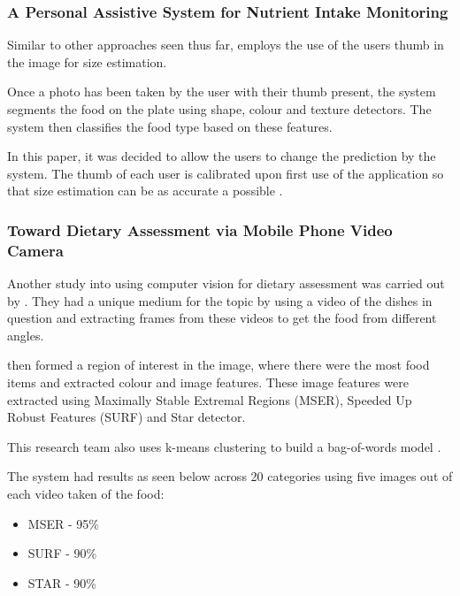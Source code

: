 
\subsubsection*{A Personal Assistive System for Nutrient Intake Monitoring}
Similar to other approaches seen thus far, \textcite{personalAssistive} employs the use of the users thumb in the image for size estimation.

Once a photo has been taken by the user with their thumb present, the system segments the food on the plate using shape, colour and texture detectors.
The system then classifies the food type based on these features.

In this paper, it was decided to allow the users to change the prediction by the system.
The thumb of each user is calibrated upon first use of the application so that size estimation can be as accurate a possible \textcite{personalAssistive}.

\subsubsection*{Toward Dietary Assessment via Mobile Phone Video Camera}
Another study into using computer vision for dietary assessment was carried out by \textcite{chen2010toward}. They had a unique medium for the topic by using a video of the dishes in question and extracting frames from these videos to get the food from different angles.

\textcite{chen2010toward} then formed a region of interest in the image, where there were the most food items and extracted colour and image features.
These image features were extracted using Maximally Stable Extremal Regions (MSER), Speeded Up Robust Features (SURF) and Star detector.

This research team also uses k-means clustering to build a bag-of-words model \textcite{chen2010toward}.

The system had results as seen below across 20 categories using five images out of each video taken of the food:
\begin{itemize}
	\item{MSER - 95\%}
	\item{SURF - 90\%}
	\item{STAR - 90\%}
\end{itemize}

